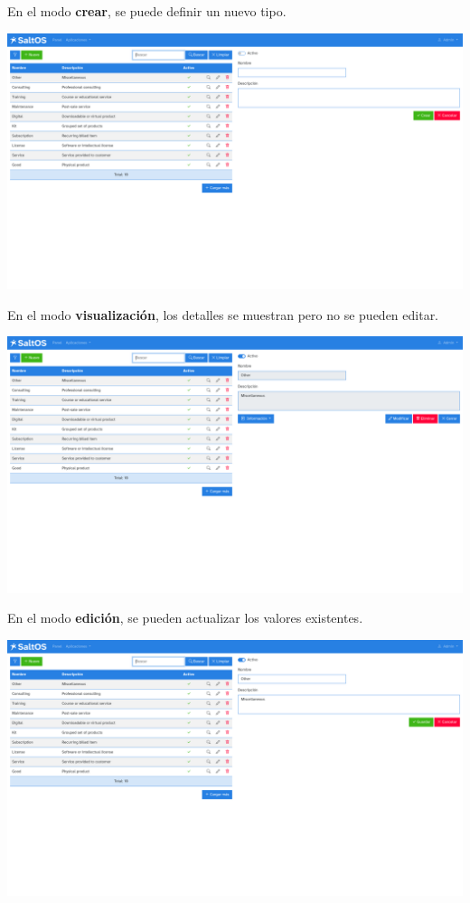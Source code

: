 \documentclass[a4paper]{article}
\begin{document}
En el modo \textbf{crear}, se puede definir un nuevo tipo.

\begin{center}\includegraphics[width=1\textwidth]{../ujest/snaps/test-screenshots-js-screenshots-sales-products-types-create-es-es-1-snap.png}\end{center}

En el modo \textbf{visualización}, los detalles se muestran pero no se pueden editar.

\begin{center}\includegraphics[width=1\textwidth]{../ujest/snaps/test-screenshots-js-screenshots-sales-products-types-view-10-es-es-1-snap.png}\end{center}

En el modo \textbf{edición}, se pueden actualizar los valores existentes.

\begin{center}\includegraphics[width=1\textwidth]{../ujest/snaps/test-screenshots-js-screenshots-sales-products-types-edit-10-es-es-1-snap.png}\end{center}
\end{document}
